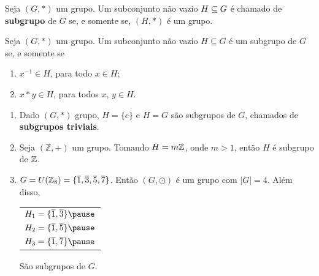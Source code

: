 \documentclass{beamer}
\begin{document}
    \begin{frame}
        \begin{definicao}
            Seja $(G,*)$ um grupo. \pause Um subconjunto não vazio \pause $H\subseteq G$ \pause é chamado de \textbf{subgrupo} de $G$ \pause se, e somente se, $(H,*)$ \pause é um grupo.\pause
        \end{definicao}

        \begin{proposicao}
            Seja $(G, *)$ um grupo. \pause Um subconjunto não vazio \pause $H\subseteq G$ é um subgrupo de $G$ \pause se, e somente se\pause
            \begin{enumerate}[label={\roman*})]
                \item\label{subgrupo_condicao_1} $x^{-1}\in H$, \pause para todo $x \in H$;
                \item\label{subgrupo_condicao_2} $x*y\in H$, \pause para todos $x$, $y \in H$.\pause
            \end{enumerate}
        \end{proposicao}
    \end{frame}

    \begin{frame}
        \begin{exemplos}
            \begin{enumerate}[label={\roman*})]
                \item Dado $(G,*)$ grupo, \pause $H=\{e\}$ \pause e $H=G$ \pause são subgrupos de $G$, \pause chamados de \textbf{subgrupos triviais}.\pause

                \item Seja $(\mathbb{Z},+)$ um grupo. \pause Tomando $H = m\mathbb{Z}$, \pause onde $m > 1$, então $H$ é subgrupo de $\mathbb{Z}$.\pause

                \item $G = U(\mathbb{Z}_8) = \{\overline{1}, \overline{3}, \overline{5}, \overline{7}\}$. \pause Então $(G,\odot)$ é um grupo \pause com $|G| = 4$. \pause Além disso,\pause
                \begin{center}
                    \begin{tabular}{l}
                        $H_1 = \{\overline{1}, \overline{3}\}\pause$\\
                        $H_2 = \{\overline{1}, \overline{5}\}\pause$\\
                        $H_3 = \{\overline{1}, \overline{7}\}\pause$
                    \end{tabular}
                \end{center}
                São subgrupos de $G$.
                \seti
            \end{enumerate}
        \end{exemplos}
    \end{frame}
\end{document}
